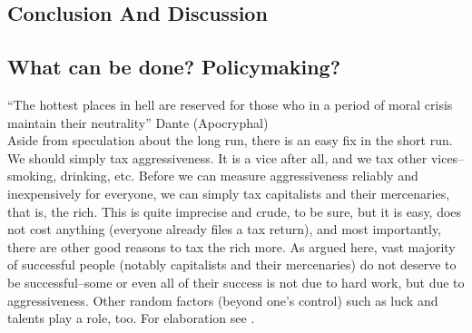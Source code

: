 \documentclass[11pt, letterpaper]{article}
\begin{document}
\begin{spacing}{2.0}
\section*{Conclusion And Discussion}




\subsection*{What can be done? Policymaking?}

``The hottest places in hell are reserved for those who in a period of moral crisis maintain their neutrality'' Dante (Apocryphal)\\






Aside from speculation about the long run, there is an easy fix in the short
run. We should simply tax aggressiveness. It is a vice after all, and we tax other
vices--smoking, drinking, etc. %
 Before we can measure aggressiveness reliably
 and inexpensively for everyone, we can simply
tax capitalists and their mercenaries, that is, the rich.
 This is quite imprecise and crude, to be sure, but it is easy, does not cost
 anything (everyone already files a tax return), and most importantly, there are other good reasons to tax the rich more. 
 As argued here,
vast majority of successful people (notably capitalists and their mercenaries) do
not deserve to be successful--some or even all of their success is not due to
hard work, but due to aggressiveness. Other random factors (beyond one's control)
such as luck and talents play a role, too. For elaboration see \citet{frank12,frank16}.


\end{spacing}
\end{document}
